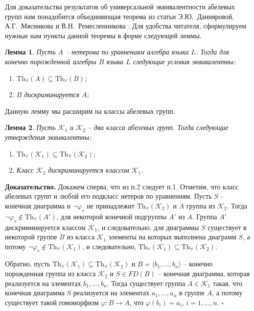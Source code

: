 \documentclass[a4paper,11pt,twoside]{article}
\newtheorem{lemma}{Лемма}[section]
\def\K{{\mathcal{K}}}
\def\Tha{{\mathrm{Th}_\forall}}
\begin{document}
Для доказательства результатов об универсальной эквивалентности абелевых групп нам понадобится объединяющая теорема из статьи Э.Ю.~Данияровой, А.Г.~Мясникова и В.Н.~Ремесленникова \cite{DMR1}. Для удобства читателя, сформулируем нужные нам пункты данной теоремы в форме следующей леммы.

\begin{lemma}\label{lemma:UnivEquiv}
Пусть $A$ -- нетерова по уравнениям алгебра языка $L$. Тогда для конечно порожденной алгебры $B$ языка $L$ следующие условия эквивалентны:
\begin{enumerate}
\item $\mathrm{Th}_{\forall}(A) \subseteq \mathrm{Th}_{\forall}(B)$;
\item $B$ дискриминируется $A$;
\end{enumerate}
\end{lemma}

Данную лемму мы расширим на классы абелевых групп.

\begin{lemma}\label{lemma:UnivEquivForClass}
Пусть $\K_1$ и $\K_2$ -- два класса абелевых групп. Тогда следующие утверждения эквивалентны:
\begin{enumerate}
\item $\Tha(\K_1) \subseteq \Tha(\K_2)$;
\item Класс $\K_2$ дискриминируется классом $\K_1$.
\end{enumerate}
\end{lemma}

{\bf Доказательство.} Докажем сперва, что из п.2 следует п.1. Отметим, что класс абелевых групп и любой его подкласс нетеров по уравнениям. Пусть $S$ -- конечная диаграмма и $\neg \varphi_s$ не принадлежит $\Tha(\K_2)$ и $A$ группа из $\K_2$. Тогда $\neg \varphi_s \notin \Tha(A')$, для некоторой конечной подгруппы $A'$ из $A$. Группа $A'$ дискриминируется классом $\K_1$, и следовательно, для диаграммы $S$ существует в некоторой группе $B$ из класса $\K_1$ элементы на которых выполнена диаграмм $S$, а потому $\neg \varphi_s \notin \Tha(\K_1)$, и следовательно, $\Tha(\K_1) \subseteq \Tha(\K_2)$.

Обратно, пусть $\Tha(\K_1) \subseteq \Tha(\K_2)$ и $B = \langle b_1, \ldots, b_n\rangle$ -- конечно порожденная группа из класса $\K_2$ и $S \in FD(B)$ -- конечная диаграмма, которая реализуется на элементах $b_1, \ldots, b_n$. Тогда существует группа $A \in \K_1$ такая, что конечная диаграмма $S$ реализуется на элементах $a_1, \ldots, a_n$ в группе $A$, а потому существует такой гомоморфизм $\varphi: B \rightarrow A$, что $\varphi(b_i) = a_i$, $i = 1, \ldots, n$. $\square$
\end{document}
